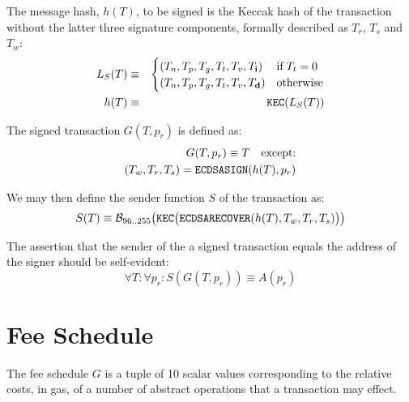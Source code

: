 \documentclass[9pt,oneside]{amsart}
\begin{document}
The message hash, $h(T)$, to be signed is the Keccak hash of the transaction without the latter three signature components, formally described as $T_r$, $T_s$ and $T_w$:
\begin{eqnarray}
L_S(T) & \equiv & \begin{cases}
(T_n, T_p, T_g, T_t, T_v, T_\mathbf{i}) & \text{if} \; T_t = 0\\
(T_n, T_p, T_g, T_t, T_v, T_\mathbf{d}) & \text{otherwise} 
\end{cases} \\
h(T) & \equiv & \mathtt{\small KEC}( L_S(T) )
\end{eqnarray}

The signed transaction $G(T, p_r)$ is defined as:
\begin{eqnarray}
G(T, p_r) \equiv T \quad \text{except:} \\
(T_w, T_r, T_s) = \mathtt{\small ECDSASIGN}(h(T), p_r)
\end{eqnarray}

We may then define the sender function $S$ of the transaction as:
\begin{equation}
S(T) \equiv \mathcal{B}_{96..255}\big(\mathtt{\tiny KEC}\big( \mathtt{\small ECDSARECOVER}(h(T), T_w, T_r, T_s) \big) \big)
\end{equation}

The assertion that the sender of the a signed transaction equals the address of the signer should be self-evident:
\begin{equation}
\forall T: \forall p_r: S(G(T, p_r)) \equiv A(p_r)
\end{equation}

\section{Fee Schedule}\label{app:fees}

The fee schedule $G$ is a tuple of 10 scalar values corresponding to the relative costs, in gas, of a number of abstract operations that a transaction may effect.
\end{document}
